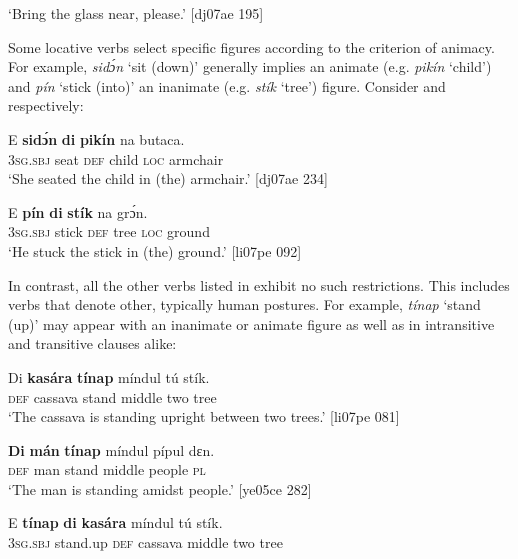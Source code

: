 \glt ‘Bring the glass near, please.’ [dj07ae 195]
\z

Some locative verbs select specific figures according to the criterion of animacy. For example, \textit{sidɔ́n} ‘sit (down)’ generally implies an animate (e.g.\textit{ pikín} ‘child’) and \textit{pín} ‘stick (into)’ an inanimate (e.g. \textit{stík} ‘tree’) figure. Consider  and  respectively: 


\ea%
    \label{ex:key:941}
    \gll E    \textbf{sidɔ́n}  \textbf{di}  \textbf{pikín}  na  butaca.\\
\textsc{3sg.sbj}  seat    \textsc{def}  child  \textsc{loc}  armchair\\

\glt ‘She seated the child in (the) armchair.’ [dj07ae 234]
\z


\ea%
    \label{ex:key:942}
    \gll E    \textbf{pín}    \textbf{di}  \textbf{stík}  na  grɔ́n.\\
\textsc{3sg.sbj}  stick  \textsc{def}  tree  \textsc{loc}  ground\\

\glt ‘He stuck the stick in (the) ground.’ [li07pe 092]
\z

In contrast, all the other verbs listed in  exhibit no such restrictions. This includes verbs that denote other, typically human postures. For example, \textit{tínap} ‘stand (up)’ may appear with an inanimate  or animate  figure as well as in intransitive and transitive  clauses alike:


\ea%
    \label{ex:key:943}
    \gll Di  \textbf{kasára}  \textbf{tínap}  míndul  tú  stík.\\
\textsc{def}  cassava  stand  middle  two  tree\\

\glt ‘The cassava is standing upright between two trees.’ [li07pe 081]
\z


\ea%
    \label{ex:key:944}
    \gll \textbf{Di}  \textbf{mán}  \textbf{tínap}  míndul  pípul  dɛn.\\
\textsc{def}  man    stand  middle  people  \textsc{pl}\\

\glt ‘The man is standing amidst people.’ [ye05ce 282]
\z


\ea%
    \label{ex:key:945}
    \gll E    \textbf{tín}\textbf{ap}  \textbf{di}  \textbf{kasára}  míndul  tú  stík.\\
\textsc{3sg.sbj}  stand.up  \textsc{def}  cassava  middle  two  tree\\

